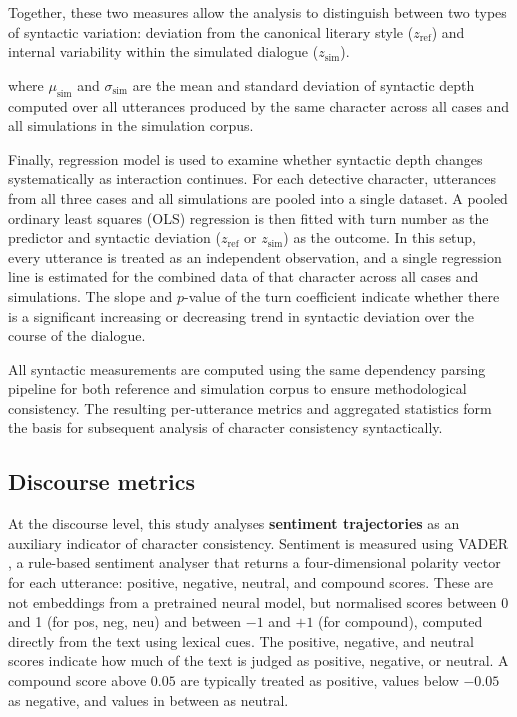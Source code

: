 \documentclass{article}
\begin{document}
Together, these two measures allow the analysis to distinguish between two types of syntactic variation: deviation from the canonical literary style ($z_{\mathrm{ref}}$) and internal variability within the simulated dialogue ($z_{\mathrm{sim}}$). 

where $\mu_{\mathrm{sim}}$ and $\sigma_{\mathrm{sim}}$ are the mean and standard deviation of syntactic depth computed over all utterances produced by the same character across all cases and all simulations in the simulation corpus.

Finally, regression model is used to examine whether syntactic depth changes systematically as interaction continues. For each detective character, utterances from all three cases and all simulations are pooled into a single dataset. A pooled ordinary least squares (OLS) regression is then fitted with turn number as the predictor and syntactic deviation ($z_{\mathrm{ref}}$ or $z_{\mathrm{sim}}$) as the outcome. In this setup, every utterance is treated as an independent observation, and a single regression line is estimated for the combined data of that character across all cases and simulations. The slope and $p$-value of the turn coefficient indicate whether there is a significant increasing or decreasing trend in syntactic deviation over the course of the dialogue.

All syntactic measurements are computed using the same dependency parsing pipeline for both reference and simulation corpus to ensure methodological consistency. The resulting per-utterance metrics and aggregated statistics form the basis for subsequent analysis of character consistency syntactically.


\subsection{Discourse metrics} \label{sec:eval_discourse}

At the discourse level, this study analyses \textbf{sentiment trajectories} as an auxiliary indicator of character consistency. Sentiment is measured using VADER \citep{Hutto2014}, a rule-based sentiment analyser that returns a four-dimensional polarity vector for each utterance: positive, negative, neutral, and compound scores. These are not embeddings from a pretrained neural model, but normalised scores between 0 and 1 (for pos, neg, neu) and between $-1$ and $+1$ (for compound), computed directly from the text using lexical cues. The positive, negative, and neutral scores indicate how much of the text is judged as positive, negative, or neutral. A compound score above $0.05$ are typically treated as positive, values below $-0.05$ as negative, and values in between as neutral.
\end{document}
